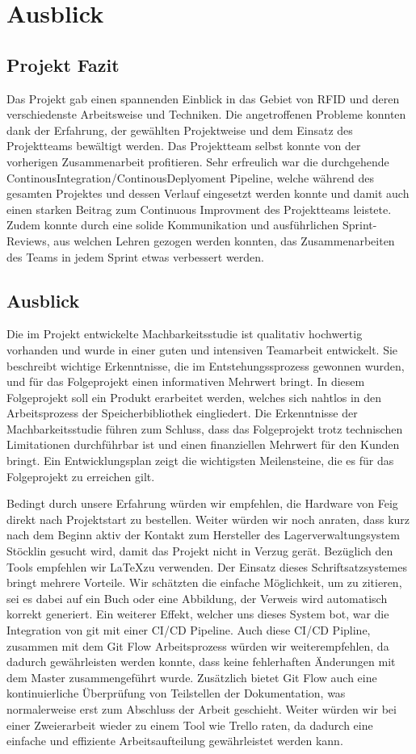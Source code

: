 \chapter{Ausblick}
\label{ch:Ausblick}

\section{Projekt Fazit}
Das Projekt gab einen spannenden Einblick in das Gebiet von RFID und deren verschiedenste Arbeitsweise und Techniken. Die angetroffenen Probleme konnten dank der Erfahrung, der gewählten Projektweise und dem Einsatz des Projektteams bewältigt werden. Das Projektteam selbst konnte von der vorherigen Zusammenarbeit profitieren. Sehr erfreulich war die durchgehende ContinousIntegration/ContinousDeplyoment Pipeline, welche während des gesamten Projektes und dessen Verlauf eingesetzt werden konnte und damit auch einen starken Beitrag zum Continuous Improvment des Projektteams leistete. Zudem konnte durch eine solide Kommunikation und ausführlichen Sprint-Reviews, aus welchen Lehren gezogen werden konnten, das Zusammenarbeiten des Teams in jedem Sprint etwas verbessert werden.

\section{Ausblick}
Die im Projekt entwickelte Machbarkeitsstudie ist qualitativ hochwertig vorhanden und wurde in einer guten und intensiven Teamarbeit entwickelt. Sie beschreibt wichtige Erkenntnisse, die im Entstehungssprozess gewonnen wurden, und für das Folgeprojekt einen informativen Mehrwert bringt. In diesem Folgeprojekt soll ein Produkt erarbeitet werden, welches sich nahtlos in den Arbeitsprozess der Speicherbibliothek eingliedert. Die Erkenntnisse der Machbarkeitsstudie führen zum Schluss, dass das Folgeprojekt trotz technischen Limitationen durchführbar ist und einen finanziellen Mehrwert für den Kunden bringt. Ein Entwicklungsplan zeigt die wichtigsten Meilensteine, die es für das Folgeprojekt zu erreichen gilt.

Bedingt durch unsere Erfahrung würden wir empfehlen, die Hardware von Feig direkt nach Projektstart zu bestellen. Weiter würden wir noch anraten, dass kurz nach dem Beginn aktiv der Kontakt zum Hersteller des Lagerverwaltungsystem Stöcklin gesucht wird, damit das Projekt nicht in Verzug gerät. Bezüglich den Tools empfehlen wir \LaTeX zu verwenden. Der Einsatz dieses Schriftsatzsystemes bringt mehrere Vorteile. Wir schätzten die einfache Möglichkeit, um zu zitieren, sei es dabei auf ein Buch oder eine Abbildung, der Verweis wird automatisch korrekt generiert. Ein weiterer Effekt, welcher uns dieses System bot, war die Integration von git mit einer CI/CD Pipeline. Auch diese CI/CD Pipline, zusammen mit dem Git Flow Arbeitsprozess würden wir weiterempfehlen, da dadurch gewährleisten werden konnte, dass keine fehlerhaften Änderungen mit dem Master zusammengeführt wurde. Zusätzlich bietet Git Flow auch eine kontinuierliche Überprüfung von Teilstellen der Dokumentation, was normalerweise erst zum Abschluss der Arbeit geschieht. Weiter würden wir bei einer Zweierarbeit wieder zu einem Tool wie Trello raten, da dadurch eine einfache und effiziente Arbeitsaufteilung gewährleistet werden kann.
